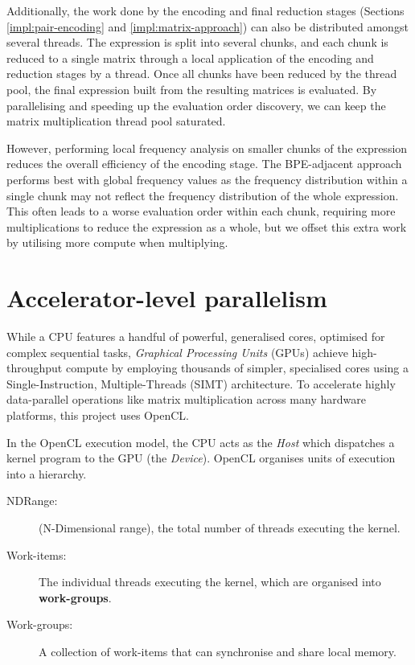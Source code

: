 Additionally, the work done by the encoding and final reduction stages
(Sections \ref{impl:pair-encoding} and \ref{impl:matrix-approach})
can also be distributed amongst several threads. 
The expression is split into several chunks, and each chunk is reduced to a single matrix through a local application
of the encoding and reduction stages by a thread. Once all chunks have been reduced by the thread pool, the final 
expression built from the resulting matrices is evaluated. By parallelising and speeding up the evaluation order
discovery, we can keep the matrix multiplication thread pool saturated.

However, performing local frequency analysis on smaller chunks of the expression reduces the overall efficiency of the 
encoding stage. The BPE-adjacent approach performs best with global frequency values as the frequency distribution
within a single chunk may not reflect the frequency distribution of the whole expression. This often leads to a 
worse evaluation order within each chunk, requiring more multiplications to reduce the expression as a whole, but we
offset this extra work by utilising more compute when multiplying. 


\section{Accelerator-level parallelism} \label{impl:gpu}


While a CPU features a handful of powerful, generalised cores, optimised for complex sequential tasks, 
\textit{Graphical Processing Units} (GPUs) achieve high-throughput compute by employing thousands of simpler, specialised cores
using a Single-Instruction, Multiple-Threads (SIMT) \cite{flynntaxonomy} architecture. To accelerate highly data-parallel 
operations like matrix multiplication across many hardware platforms, this project uses OpenCL.

In the OpenCL execution model, the CPU acts as the \textit{Host} which dispatches a kernel program to the GPU (the \textit{Device}).
OpenCL organises units of execution into a hierarchy.
\begin{description}
  \item [NDRange:] (N-Dimensional range), the total number of threads executing the kernel.
  \item [Work-items:] The individual threads executing the kernel, which are organised into \textbf{work-groups}.
  \item [Work-groups:] A collection of work-items that can synchronise and share local memory.
\end{description}

